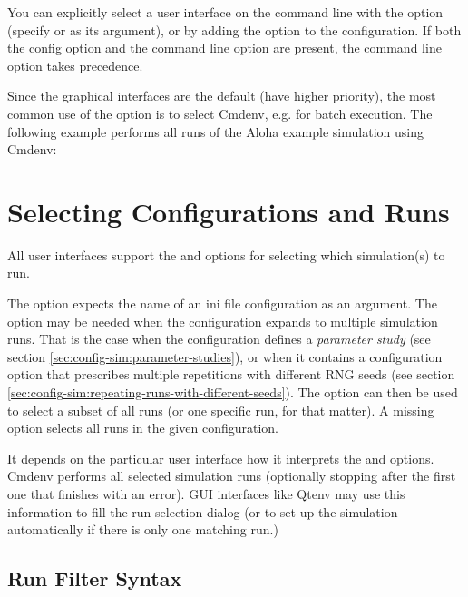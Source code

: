 You can explicitly select a user interface on the command line with the 
option (specify  or  as its argument), or by
adding the  option to the configuration. If both
the config option and the command line option are present, the command line option
takes precedence.

Since the graphical interfaces are the default (have higher priority), the most
common use of the  option is to select Cmdenv, e.g. for batch execution.
The following example performs all runs of the Aloha example simulation using
Cmdenv:



\section{Selecting Configurations and Runs}
\label{sec:run-sim:selecting-configuration-and-runs}

All user interfaces support the  and 
options for selecting which simulation(s) to run.

The  option expects the name of an ini file configuration
as an argument. The  option may be needed when the configuration
expands to multiple simulation runs. That is the case when the
configuration defines a \textit{parameter study} (see section
\ref{sec:config-sim:parameter-studies}), or when it contains
a  configuration option that prescribes
multiple repetitions with different RNG seeds (see section
\ref{sec:config-sim:repeating-runs-with-different-seeds}).
The  option can then be used to select a subset of all runs (or one
specific run, for that matter). A missing  option selects all runs in
the given configuration.

It depends on the particular user interface how it interprets the
 and  options. Cmdenv performs all selected simulation runs
(optionally stopping after the first one that finishes with an error).
GUI interfaces like Qtenv may use this information to fill the
run selection dialog (or to set up the simulation automatically if there is
only one matching run.)


\subsection{Run Filter Syntax}
\label{sec:run-sim:selecting-configuration-and-runs:syntax}

